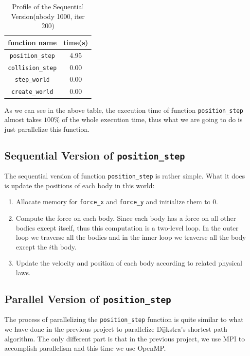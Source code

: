 \documentclass{article}
\begin{document}
\begin{table}
	\centering
	\begin{tabular}{c|c}
		function name & time(s) \\ \hline
		\verb|position_step| & 4.95 \\ \hline
		\verb|collision_step| & 0.00 \\ \hline
		\verb|step_world| & 0.00 \\ \hline
		\verb|create_world| & 0.00 
	\end{tabular}
	\caption{Profile of the Sequential Version(nbody 1000, iter 200)}
\end{table}
As we can see in the above table, the execution time of function \verb|position_step| almost takes $100\%$ of the whole execution time, thus
what we are going to do is just parallelize this function.


\subsection{Sequential Version of \texttt{position\_step}}
The sequential version of function \verb|position_step| is rather simple.
What it does is update the positions of each body in this world:
\begin{enumerate}
\item Allocate memory for \verb|force_x| and \verb|force_y| and initialize them to 0.
\item Compute the force on each body. Since each body has a force on all other bodies except itself, thus this computation is a two-level loop. In the outer loop we traverse all the bodies and in the inner loop we traverse all the body except the $i$th body.
\item Update the velocity and position of each body according to related physical laws.
\end{enumerate}


\subsection{Parallel Version of \texttt{position\_step}}
The process of parallelizing the \verb|position_step| function is quite
similar to what we have done in the previous project to parallelize
Dijkstra's shortest path algorithm. The only different part is that in the
previous project, we use MPI to accomplish parallelism and this time we use
OpenMP.
\end{document}
